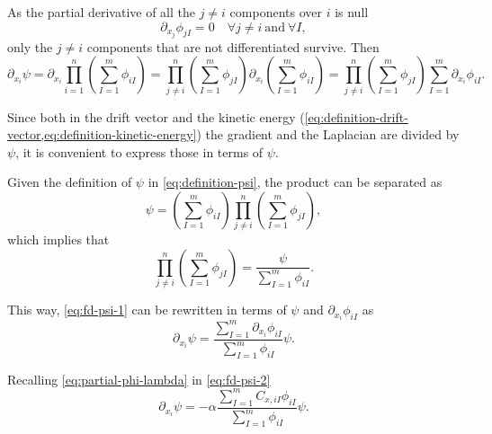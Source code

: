 As the partial derivative of all the $j \not= i$ components over $i$ is null 
\begin{equation}
    \partial_{x_j} \phi_{jI} = 0\quad \forall j \not= i\ \mathrm{and}\ \forall I,
\end{equation}
only the $j\not= i$ components that are not differentiated survive. Then 
\begin{equation} \label{eq:fd-psi-1}
    \partial_{x_i} \psi 
    =
    \partial_{x_i} \prod_{i=1}^{n} \left( \sum_{I=1}^{m} \phi_{iI} \right)
    =
    \prod_{j\not=i}^{n} \left( \sum_{I=1}^{m} \phi_{jI} \right)
    \partial_{x_i} \left( \sum_{I=1}^{m} \phi_{iI} \right)
    =
    \prod_{j\not=i}^{n} \left( \sum_{I=1}^{m} \phi_{jI} \right)
    \sum_{I=1}^{m} \partial_{x_i} \phi_{iI}
    .
\end{equation}

Since both in the drift vector and the kinetic energy 
(\cref{eq:definition-drift-vector,eq:definition-kinetic-energy}) the gradient and the Laplacian
are divided by $\psi$, it is convenient to express those in terms of
$\psi$.

Given the definition of $\psi$ in \cref{eq:definition-psi}, the product can be
separated as
\begin{equation}
    \psi =
    \left( \sum_{I=1}^{m} \phi_{iI} \right)
    \prod_{j\not=i}^{n} \left( \sum_{I=1}^{m} \phi_{jI} \right)
    ,
\end{equation}
which implies that
\begin{equation}
    \prod_{j\not=i}^{n} \left( \sum_{I=1}^{m} \phi_{jI} \right)
    =
    \frac{\psi}{
        \sum_{I=1}^{m} \phi_{iI}
    }
    .
\end{equation}

This way, \cref{eq:fd-psi-1} can be rewritten in terms of $\psi$ and 
$\partial_{x_i} \phi_{iI}$ as
\begin{equation} \label{eq:fd-psi-2}
    \partial_{x_i} \psi 
    =
    \frac{
        \sum_{I=1}^{m} \partial_{x_i} \phi_{iI}
    }{
        \sum_{I=1}^{m} \phi_{iI}
    }
    \psi
    .
\end{equation}

Recalling \cref{eq:partial-phi-lambda} in \cref{eq:fd-psi-2}
\begin{equation} \label{eq:derivada-psi-xi}
    \partial_{x_i} \psi 
    =
    -\alpha
    \frac{
        \sum_{I=1}^{m} 
        C_{x,iI}
        \phi_{iI} 
    }{
        \sum_{I=1}^{m} \phi_{iI}
    }
    \psi
    .
\end{equation}

